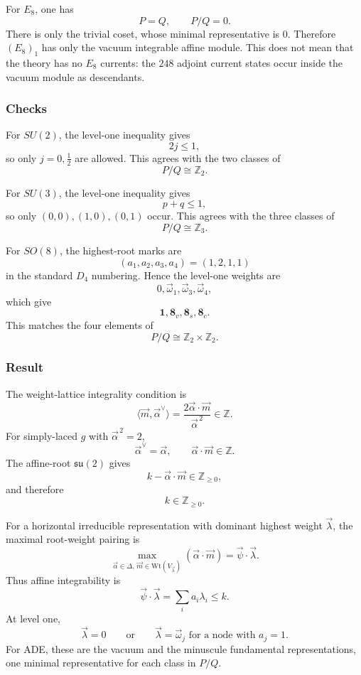 \documentclass[
  10pt,
  a4paper,
  openany]{book}
\begin{document}
For \(E_8\), one has \[
P=Q,
\qquad
P/Q=0.
\] There is only the trivial coset, whose minimal representative is
\(0\). Therefore \((E_8)_1\) has only the vacuum integrable affine
module. This does not mean that the theory has no \(E_8\) currents: the
\(248\) adjoint current states occur inside the vacuum module as
descendants.

\subsubsection{Checks}\label{checks-10}

For \(SU(2)\), the level-one inequality gives \[
2j\leq1,
\] so only \(j=0,\frac12\) are allowed. This agrees with the two classes
of \[
P/Q\cong\mathbb Z_2.
\]

For \(SU(3)\), the level-one inequality gives \[
p+q\leq1,
\] so only \((0,0),(1,0),(0,1)\) occur. This agrees with the three
classes of \[
P/Q\cong\mathbb Z_3.
\]

For \(SO(8)\), the highest-root marks are \[
(a_1,a_2,a_3,a_4)=(1,2,1,1)
\] in the standard \(D_4\) numbering. Hence the level-one weights are \[
0,\vec\omega_1,\vec\omega_3,\vec\omega_4,
\] which give \[
\mathbf 1,\mathbf 8_v,\mathbf 8_s,\mathbf 8_c.
\] This matches the four elements of \[
P/Q\cong\mathbb Z_2\times\mathbb Z_2.
\]

\subsubsection{Result}\label{result-14}

The weight-lattice integrality condition is \[
\langle\vec m,\vec\alpha^{\vee}\rangle
=\frac{2\vec\alpha\cdot\vec m}{\vec\alpha^{\,2}}
\in\mathbb Z.
\] For simply-laced \(g\) with \(\vec\alpha^{\,2}=2\), \[
\vec\alpha^{\vee}=\vec\alpha,
\qquad
\vec\alpha\cdot\vec m\in\mathbb Z.
\] The affine-root \(\mathfrak{su}(2)\) gives \[
k-\vec\alpha\cdot\vec m
\in\mathbb Z_{\geq0},
\] and therefore \[
k\in\mathbb Z_{\geq0}.
\]

For a horizontal irreducible representation with dominant highest weight
\(\vec\lambda\), the maximal root-weight pairing is \[
\max_{\vec\alpha\in\Delta,\,\vec m\in\mathrm{Wt}(V_{\vec\lambda})}
(\vec\alpha\cdot\vec m)
=\vec\psi\cdot\vec\lambda.
\] Thus affine integrability is \[
\boxed{
\vec\psi\cdot\vec\lambda
=\sum_i a_i\lambda_i
\leq k.
}
\] At level one, \[
\vec\lambda=0
\qquad\text{or}\qquad
\vec\lambda=\vec\omega_j
\text{ for a node with }a_j=1.
\] For ADE, these are the vacuum and the minuscule fundamental
representations, one minimal representative for each class in \(P/Q\).
\end{document}
